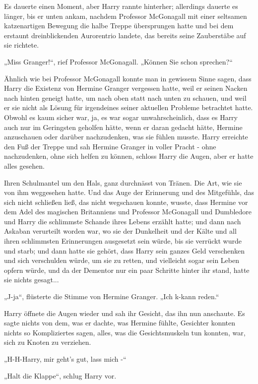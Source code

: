 {Es dauerte einen Moment, aber Harry rannte hinterher; allerdings dauerte es länger, bis er unten ankam, nachdem Professor McGonagall mit einer seltsamen katzenartigen Bewegung die halbe Treppe übersprungen hatte und bei dem erstaunt dreinblickenden Aurorentrio landete, das bereits seine Zauberstäbe auf sie richtete.

„Miss Granger!“, rief Professor McGonagall. „Können Sie schon sprechen?“

Ähnlich wie bei Professor McGonagall konnte man in gewissem Sinne sagen, dass Harry die Existenz von Hermine Granger vergessen hatte, weil er seinen Nacken nach hinten geneigt hatte, um nach oben statt nach unten zu schauen, und weil er sie nicht als Lösung für irgendeines seiner aktuellen Probleme betrachtet hatte. Obwohl es kaum sicher war, ja, es war sogar unwahrscheinlich, dass es Harry auch nur im Geringsten geholfen hätte, wenn er daran gedacht hätte, Hermine anzuschauen oder darüber nachzudenken, was sie fühlen musste. Harry erreichte den Fuß der Treppe und sah Hermine Granger in voller Pracht - ohne nachzudenken, ohne sich helfen zu können, schloss Harry die Augen, aber er hatte alles gesehen.

Ihren Schulmantel um den Hals, ganz durchnässt von Tränen. Die Art, wie sie von ihm weggesehen hatte. Und das Auge der Erinnerung und des Mitgefühls, das sich nicht schließen ließ, das nicht wegschauen konnte, wusste, dass Hermine vor dem Adel des magischen Britanniens und Professor McGonagall und Dumbledore und Harry die schlimmste Schande ihres Lebens erzählt hatte; und dann nach Askaban verurteilt worden war, wo sie der Dunkelheit und der Kälte und all ihren schlimmsten Erinnerungen ausgesetzt sein würde, bis sie verrückt wurde und starb; und dann hatte sie gehört, dass Harry sein ganzes Geld verschenken und sich verschulden würde, um sie zu retten, und vielleicht sogar sein Leben opfern würde, und da der Dementor nur ein paar Schritte hinter ihr stand, hatte sie nichts gesagt...

„J-ja“, flüsterte die Stimme von Hermine Granger. „Ich k-kann reden.“

Harry öffnete die Augen wieder und sah ihr Gesicht, das ihn nun anschaute. Es sagte nichts von dem, was er dachte, was Hermine fühlte, Gesichter konnten nichts so Kompliziertes sagen, alles, was die Gesichtsmuskeln tun konnten, war, sich zu Knoten zu verziehen.

„H-H-Harry, mir geht's gut, lass mich -“

„Halt die Klappe“, schlug Harry vor.

}
